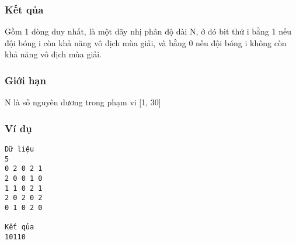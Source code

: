 \subsubsection{   Kết qủa  }

   Gồm 1 dòng duy nhất, là một dãy nhị phân độ dài N, ở đó bit thứ i bằng 1 nếu đội bóng i còn khả năng vô địch mùa giải, và bằng 0 nếu đội bóng i không còn khả năng vô địch mùa giải.  

\subsubsection{   Giới hạn  }

   N là số nguyên dương trong phạm vi [1, 30]  

\subsubsection{   Ví dụ  }
\begin{verbatim}
Dữ liệu
5
0 2 0 2 1 
2 0 0 1 0 
1 1 0 2 1 
2 0 2 0 2 
0 1 0 2 0

Kết qủa
10110

\end{verbatim}